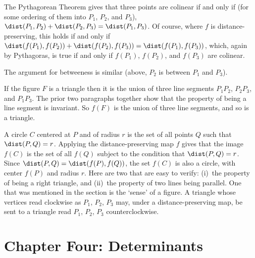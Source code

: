 \begin{ans}{5}
      \begin{exparts}
        \partsitem The Pythagorean Theorem gives that
          three points are
          colinear if and only if
          (for some ordering of them into $P_1$, $P_2$, and $P_3$),
          $\dist(P_1,P_2)+\dist(P_2,P_3)=\dist(P_1,P_3)$.
          Of course, where $f$ is distance-preserving, this holds
          if and only if
          $\dist(f(P_1),f(P_2))+\dist(f(P_2),f(P_3))=\dist(f(P_1),f(P_3))$,
          which, again by Pythagoras, is true if and only if
          $f(P_1)$, $f(P_2)$, and $f(P_3)$ are colinear.

          The argument for betweeness is similar (above, $P_2$ is
          between $P_1$ and $P_3$).

          If the figure $F$ is a triangle then it is the union of three
          line segments $P_1P_2$, $P_2P_3$, and $P_1P_3$.
          The prior two paragraphs together show that the property of
          being a line segment is invariant.
          So $f(F)$ is the union of three line segments, and so is a
          triangle.

          A circle $C$ centered at $P$ and of radius $r$ is the set of
          all points $Q$ such that $\dist(P,Q)=r$.
          Applying the distance-preserving map $f$ gives that the image
          $f(C)$ is the set of all $f(Q)$ subject to the condition that
          $\dist(P,Q)=r$.
          Since $\dist(P,Q)=\dist(f(P),f(Q))$, the set $f(C)$ is also
          a circle, with center $f(P)$ and radius $r$.
        \partsitem Here are two that are easy to verify: (i)~the
          property of being a right triangle, and (ii)~the property of
          two lines being parallel.
        \partsitem One that was mentioned in the section is the `sense' of
          a figure.
          A triangle whose vertices read clockwise as $P_1$, $P_2$, $P_3$
          may, under a distance-preserving map, be sent to a triangle
          read $P_1$, $P_2$, $P_3$ counterclockwise.
      \end{exparts}
    
\end{ans}
\chapter{Chapter Four: Determinants}
